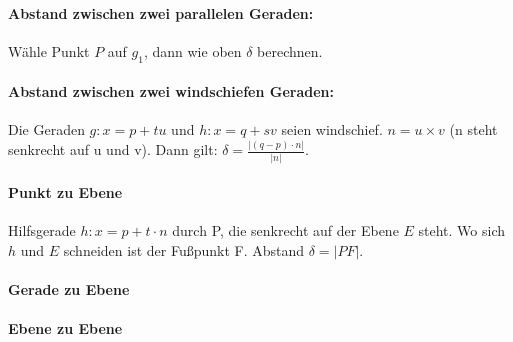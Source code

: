 \documentclass[a4paper, twocolumn]{article}
\begin{document}
      \paragraph{Abstand zwischen zwei parallelen Geraden:}
      Wähle Punkt $P$ auf $g_1$, dann wie oben $\delta$ berechnen.

      \paragraph{Abstand zwischen zwei windschiefen Geraden:}
      Die Geraden $g: x = p +  tu$ und $h: x = q + sv$ seien windschief. $n = u \times v$ (n steht senkrecht auf u und v). Dann gilt: $\delta = \frac{|(q-p) \cdot n|}{|n|}$.

      \paragraph{Punkt zu Ebene}      
      Hilfsgerade $h: x = p + t \cdot n$ durch P, die senkrecht auf der Ebene $E$ steht. Wo sich $h$ und $E$ schneiden ist der Fußpunkt F. Abstand $\delta = |PF|$.
      \paragraph{Gerade zu Ebene}
      \paragraph{Ebene zu Ebene}
   
 
\end{document}
